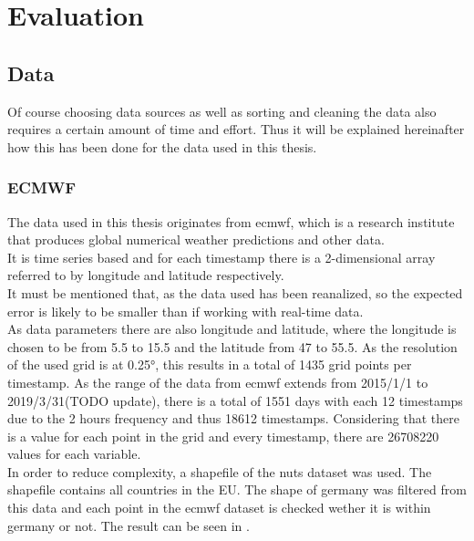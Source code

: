 \chapter{Evaluation}
\label{ch:Evaluation}

\section{Data}
\label{sec:data}

Of course choosing data sources as well as sorting and cleaning the data also requires a certain amount of time and effort. Thus it will be explained hereinafter how this has been done for the data used in this thesis.

\subsection{ECMWF}

The data used in this thesis originates from \acrshort{ecmwf}, which is a research institute that produces global numerical weather predictions and other data.\\
It is time series based and for each timestamp there is a 2-dimensional array referred to by longitude and latitude respectively.\\

It must be mentioned that, as the data used has been reanalized, so the expected error is likely to be smaller than if working with real-time data.\\

As data parameters there are also longitude and latitude, where the longitude is chosen to be from 5.5 to 15.5 and the latitude from 47 to 55.5. As the resolution of the used grid is at 0.25°, this results in a total of 1435 grid points per timestamp. As the range of the data from \acrshort{ecmwf} extends from 2015/1/1 to 2019/3/31(TODO update), there is a total of 1551 days with each 12 timestamps due to the 2 hours frequency and thus 18612 timestamps. Considering that there is a value for each point in the grid and every timestamp, there are 26708220 values for each variable.\\

In order to reduce complexity, a shapefile of the \acrshort{nuts} dataset was used. The shapefile contains all countries in the EU. The shape of germany was filtered from this data and each point in the \acrshort{ecmwf} dataset is checked wether it is within germany or not. The result can be seen in .\\



